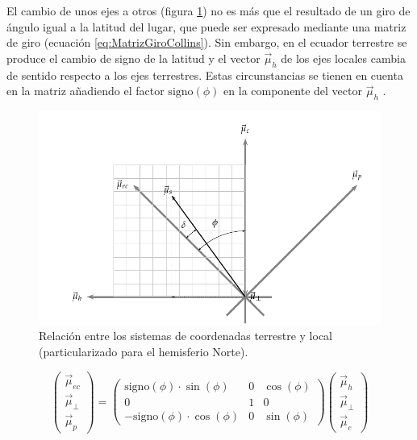 El cambio de unos ejes a otros (figura \ref{fig:RelacionSistemasCoordenadas})
no es más que el resultado de un giro de ángulo igual a la latitud
del lugar, que puede ser expresado mediante una matriz de giro (ecuación
\ref{eq:MatrizGiroCollins})\citep{CollinsII2004}. Sin embargo, en
el ecuador terrestre se produce el cambio de signo de la latitud y
el vector $\vec{\mu}_{h}$ de los ejes locales cambia de sentido respecto
a los ejes terrestres. Estas circunstancias se tienen en cuenta en
la matriz añadiendo el factor $\mathrm{signo}(\phi)$ en la componente
del vector $\vec{\mu}_{h}$ .

%
\begin{figure}
\includegraphics{../figs/RelacionSistemasCoordenadas}

\caption{Relación entre los sistemas de coordenadas terrestre y local (particularizado
para el hemisferio Norte).\label{fig:RelacionSistemasCoordenadas}}

\end{figure}


\begin{equation}
\left(\begin{array}{c}
\vec{\mu}_{ec}\\
\vec{\mu}_{\bot}\\
\vec{\mu}_{p}\end{array}\right)=\left(\begin{array}{ccc}
\mathrm{signo}(\phi)\cdot\sin(\phi) & 0 & \cos(\phi)\\
0 & 1 & 0\\
-\mathrm{signo}(\phi)\cdot\cos(\phi) & 0 & \sin(\phi)\end{array}\right)\left(\begin{array}{c}
\vec{\mu}_{h}\\
\vec{\mu}_{\bot}\\
\vec{\mu}_{c}\end{array}\right)\label{eq:MatrizGiroCollins}\end{equation}



